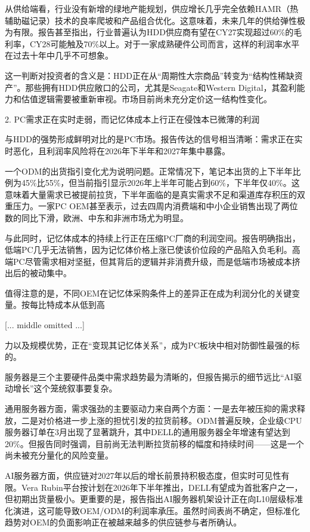 \documentclass[11pt]{ctexart}
\begin{document}
从供给端看，行业没有新增的绿地产能规划，供应增长几乎完全依赖HAMR（热辅助磁记录）技术的良率爬坡和产品组合优化。这意味着，未来几年的供给弹性极为有限。报告甚至指出，行业普遍认为HDD供应商有望在CY27实现超过60\%的毛利率，CY28可能触及70\%以上。对于一家成熟硬件公司而言，这样的利润率水平在过去十年中几乎不可想象。

这一判断对投资者的含义是：HDD正在从“周期性大宗商品”转变为“结构性稀缺资产”。那些拥有HDD供应敞口的公司，尤其是Seagate和Western Digital，其盈利能力和估值逻辑需要被重新审视。市场目前尚未充分定价这一结构性变化。

2. PC需求正在实时走弱，而记忆体成本上行正在侵蚀本已微薄的利润

与HDD的强势形成鲜明对比的是PC市场。报告传达的信号相当清晰：需求正在实时恶化，且利润率风险将在2026年下半年和2027年集中暴露。

一个ODM的出货指引变化尤为说明问题。正常情况下，笔记本出货的上下半年比例为45\%比55\%，但当前指引显示2026年上半年可能占到60\%，下半年仅40\%。这意味着大量需求已被提前拉货，下半年面临的是真实需求不足和渠道库存积压的双重压力。一家PC OEM甚至表示，过去四周内消费端和中小企业销售出现了两位数的同比下滑，欧洲、中东和非洲市场尤为明显。

与此同时，记忆体成本的持续上行正在压缩PC厂商的利润空间。报告明确指出，低端PC几乎无法销售，因为记忆体价格上涨已使该价位段的产品陷入负毛利。高端PC尽管需求相对坚挺，但其背后的逻辑并非消费升级，而是低端市场被成本挤出后的被动集中。

值得注意的是，不同OEM在记忆体采购条件上的差异正在成为利润分化的关键变量。按每比特成本从低到高

[... middle omitted ...]

力以及规模优势，正在“变现其记忆体关系”，成为PC板块中相对防御性最强的标的。

服务器是三个主要硬件品类中需求趋势最为清晰的，但报告揭示的细节远比“AI驱动增长”这个笼统叙事要复杂。

通用服务器方面，需求强劲的主要驱动力来自两个方面：一是去年被压抑的需求释放，二是对价格进一步上涨的担忧引发的拉货前移。ODM普遍反映，企业级CPU服务器订单在3月出现了显著跳升，其中DELL的通用服务器全年增速有望达到20\%。但报告同时强调，目前尚无法判断拉货前移的幅度和持续时间——这是一个尚未被充分量化的风险变量。

AI服务器方面，供应链对2027年以后的增长前景持积极态度，但实时可见性有限。Vera Rubin平台按计划在2026年下半年推出，DELL有望成为首批客户之一，但初期出货量极小。更重要的是，报告指出AI服务器机架设计正在向L10层级标准化演进，这可能导致OEM/ODM的利润率承压。虽然时间表尚不确定，但标准化趋势对OEM的负面影响正在被越来越多的供应链参与者所确认。
\end{document}
